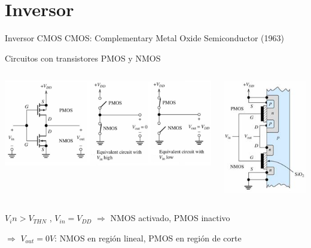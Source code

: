 \documentclass[aspectratio=169,t]{beamer}
\begin{document}
\section{Inversor}
\begin{frame}{Inversor CMOS}
\centering
CMOS: Complementary Metal Oxide Semiconductor (1963)

Circuitos con transistores PMOS y NMOS

\begin{columns}
\begin{column}{10cm}
\includegraphics[width=10cm]{inverter1}
\end{column}
\begin{column}{4cm}
\includegraphics[width=4cm]{inverter2}
\end{column}
\end{columns}


$V_in > V_{THN}$ , $V_{in} = V_{DD}$ $\Rightarrow$ NMOS activado, PMOS inactivo

$\Rightarrow$ $V_{out} = 0 V$: NMOS en región lineal, PMOS en región de corte
\end{frame}
\end{document}
